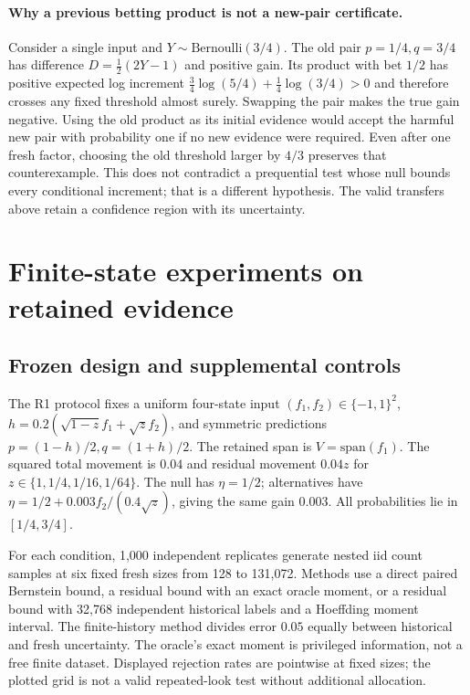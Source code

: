 \documentclass[11pt]{article}
\begin{document}
\paragraph{Why a previous betting product is not a new-pair certificate.}
Consider a single input and $Y\sim\mathrm{Bernoulli}(3/4)$. The old pair
$p=1/4,q=3/4$ has difference $D=\tfrac12(2Y-1)$ and positive gain.
Its product with bet $1/2$ has positive expected log increment
$\tfrac34\log(5/4)+\tfrac14\log(3/4)>0$ and therefore crosses any fixed
threshold almost surely. Swapping the pair makes the true gain negative.
Using the old product as its initial evidence would accept the harmful new
pair with probability one if no new evidence were required. Even after one
fresh factor, choosing the old threshold larger by $4/3$ preserves that
counterexample. This does not contradict a prequential test whose null bounds
every conditional increment; that is a different hypothesis. The valid
transfers above retain a confidence region with its uncertainty.

\section{Finite-state experiments on retained evidence}
\subsection{Frozen design and supplemental controls}
The R1 protocol fixes a uniform four-state input $(f_1,f_2)\in\{-1,1\}^2$,
$h=0.2(\sqrt{1-z}f_1+\sqrt z f_2)$, and symmetric predictions
$p=(1-h)/2,q=(1+h)/2$. The retained span is $V=\mathrm{span}(f_1)$.
The squared total movement is $0.04$ and residual movement $0.04z$ for
$z\in\{1,1/4,1/16,1/64\}$. The null has $\eta=1/2$; alternatives have
$\eta=1/2+0.003f_2/(0.4\sqrt z)$, giving the same gain $0.003$.
All probabilities lie in $[1/4,3/4]$.

For each condition, 1,000 independent replicates generate nested iid count
samples at six fixed fresh sizes from 128 to 131,072. Methods use a direct
paired Bernstein bound, a residual bound with an exact oracle moment, or a
residual bound with 32,768 independent historical labels and a Hoeffding
moment interval. The finite-history method divides error $0.05$ equally
between historical and fresh uncertainty. The oracle's exact moment is
privileged information, not a free finite dataset. Displayed rejection rates
are pointwise at fixed sizes; the plotted grid is not a valid repeated-look
test without additional allocation.
\end{document}
